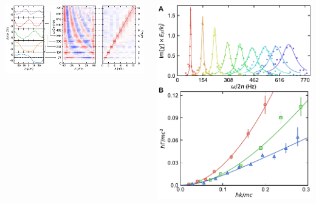 \documentclass[26pt, paperwidth=36in,paperheight=48in]{tikzposter} %
\begin{document}
\begin{columns}
{\begin{minipage}{0.2\textwidth}
	\end{minipage}
	\hspace{-6cm}
	\begin{minipage}{0.13\textwidth}
		\vspace{1.7cm}
		\includegraphics[width=9cm,
		trim=5cm 0cm 5.2cm 0cm,clip]{figures/fundamental_modes.pdf}
	\end{minipage}
	\hspace{-2cm}
	\begin{minipage}{0.3\textwidth}
		\includegraphics[width=10cm]{figures/First Sound Resonance Widths.pdf}
		\hspace{0.1cm}

\end{minipage}}
\end{columns}
\end{document}
